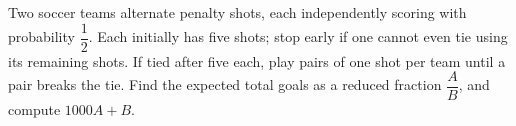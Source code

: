 Two soccer teams alternate penalty shots, each independently scoring with probability $\dfrac{1}{2}$. Each initially has five shots; stop early if one cannot even tie using its remaining shots. If tied after five each, play pairs of one shot per team until a pair breaks the tie. Find the expected total goals as a reduced fraction $\dfrac{A}{B}$, and compute $1000A+B$.
